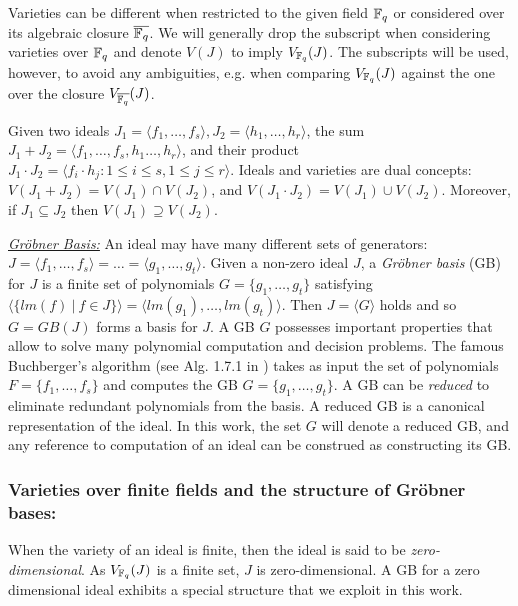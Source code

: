 Varieties can be different when restricted to the given field ${\mathbb{F}}_{q}$
or considered over its algebraic closure ${\overline{{\mathbb{F}}_q}}$. We will generally
drop the subscript when considering varieties over ${\mathbb{F}}_{q}$ and
denote $V(J)$ to imply $V_{{\mathbb{F}}_{q}}(J)$. The subscripts will be used,
however, to avoid any ambiguities, e.g. when comparing $V_{{\mathbb{F}}_{q}}(J)$
against the one over the closure $V_{{\overline{{\mathbb{F}}_q}}}(J)$. 

Given two ideals $J_1 = \langle f_1,\dots,f_s\rangle, J_2=\langle
h_1,\dots,h_r\rangle$, the sum $J_1 + J_2 = \langle
f_1,\dots,f_s,h_1\dots,h_r\rangle$, and their product $J_1\cdot J_2 =
\langle f_i\cdot h_j: 1\leq i\leq s, 1\leq j\leq r\rangle$. Ideals and
varieties are dual concepts: $V(J_1 + J_2) = V(J_1) \cap V(J_2)$, and
$V(J_1\cdot J_2) = V(J_1) \cup V(J_2)$. Moreover, if $J_1 \subseteq
J_2$ then $V(J_1)\supseteq V(J_2)$.




\underline{\it Gr\"obner Basis:} An ideal may have many different sets
of generators:  $J = \langle f_1,\dots,f_s\rangle = \dots = \langle
g_1,\dots,g_t\rangle$. Given a 
non-zero ideal $J$, a {\it Gr\"obner 
  basis} (GB) for $J$ is a finite set of polynomials $G = \{g_1,\dots,
g_t\}$ satisfying $\langle \{lm(f) ~|~ f \in J\} \rangle = \langle
lm(g_1),\dots,lm(g_t)\rangle$. Then $J = \langle G \rangle$ holds and
so $G=GB(J)$ forms a basis for $J$. A GB $G$ possesses important
properties that allow to solve many polynomial computation and
decision problems. The famous Buchberger's algorithm (see Alg. 1.7.1 
in \cite{gb_book}) takes as input the set of polynomials $F =
\{f_1,\dots,f_s\}$ and computes the GB
$G=\{g_1,\dots,g_t\}$. A GB can be {\it reduced} to eliminate
redundant polynomials from the basis. A reduced GB is a canonical
representation of the ideal. In this work, the set $G$ will denote a
reduced GB, and any reference to computation of an ideal can be 
construed as constructing its GB.  

\subsubsection{Varieties over finite fields and the structure of
  Gr\"obner bases:} When the variety of an ideal is finite, then the
ideal is said to be {\it zero-dimensional}. As $V_{{\mathbb{F}}_{q}}(J)$ is a
finite set, $J$ is zero-dimensional. 
A GB for a zero dimensional ideal exhibits a 
special structure that we exploit in this work. 


